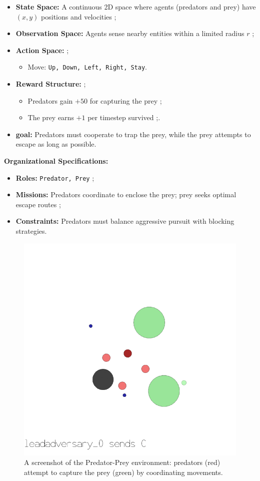 \documentclass[pdflatex,sn-mathphys-num]{sn-jnl}%
\theoremstyle{thmstyleone}%
\theoremstyle{thmstyletwo}%
\theoremstyle{thmstylethree}%
\begin{document}
\begin{itemize}
    \item \textbf{State Space:} A continuous 2D space where agents (predators and prey) have $(x, y)$ positions and velocities ;
    \item \textbf{Observation Space:} Agents sense nearby entities within a limited radius $r$ ;
    \item \textbf{Action Space:}  ;
          \begin{itemize}
              \item Move: \texttt{Up, Down, Left, Right, Stay}.
          \end{itemize}
    \item \textbf{Reward Structure:} ;
          \begin{itemize}
              \item Predators gain $+50$ for capturing the prey ;
              \item The prey earns $+1$ per timestep survived ;.
          \end{itemize}
    \item \textbf{goal:} Predators must cooperate to trap the prey, while the prey attempts to escape as long as possible.
\end{itemize}

\textbf{Organizational Specifications:}
\begin{itemize}
    \item \textbf{Roles:} \texttt{Predator, Prey} ;
    \item \textbf{Missions:} Predators coordinate to enclose the prey; prey seeks optimal escape routes ;
    \item \textbf{Constraints:} Predators must balance aggressive pursuit with blocking strategies.
\end{itemize}

\begin{figure}[h!]
    \centering
    \includegraphics[width=0.7\linewidth]{figures/predator_prey.png}
    \caption{A screenshot of the Predator-Prey environment: predators (red) attempt to capture the prey (green) by coordinating movements.}
    \label{fig:predator_prey}
\end{figure}
\end{document}

